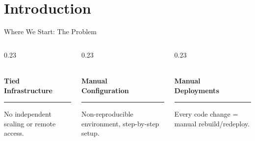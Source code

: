 \section{Introduction}
{

\begin{frame}{Where We Start: The Problem}

\vspace{0.2cm}

\begin{columns}[T, totalwidth=\textwidth]
  \begin{column}{0.23\textwidth}
    \begin{tcolorbox}[problemcard=HUAblue]
      \centering
      {\color{problemorange}\faExclamationTriangle}\\[4pt]
      {\color{HUAblue}\bfseries\scriptsize Tied\\[-2pt]Infrastructure}
      \vspace{4pt}
      \hrule
      \vspace{4pt}
      \raggedright\tiny
      No independent scaling or remote access.
    \end{tcolorbox}
  \end{column}
  
  \begin{column}{0.23\textwidth}
    \begin{tcolorbox}[problemcard=HUAblue]
      \centering
      {\color{problemorange}\faCogs}\\[4pt]
      {\color{HUAblue}\bfseries\scriptsize Manual\\[-2pt]Configuration}
      \vspace{4pt}
      \hrule
      \vspace{4pt}
      \raggedright\tiny
      Non-reproducible environment, step-by-step setup.
    \end{tcolorbox}
  \end{column}
  
  \begin{column}{0.23\textwidth}
    \begin{tcolorbox}[problemcard=HUAblue]
      \centering
      {\color{problemorange}\faSync}\\[4pt]
      {\color{HUAblue}\bfseries\scriptsize Manual\\[-2pt]Deployments}
      \vspace{4pt}
      \hrule
      \vspace{4pt}
      \raggedright\tiny
      Every code change = manual rebuild/redeploy.
    \end{tcolorbox}
  \end{column}
  

\end{columns}
\end{frame}}

